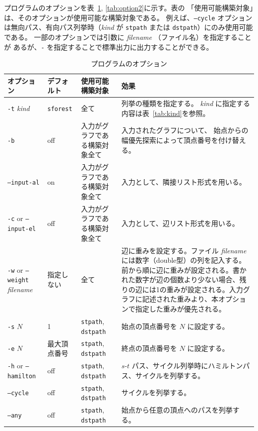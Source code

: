 \documentclass{jsarticle}
\begin{document}
プログラムのオプションを表~\ref{tab:option}, \ref{tab:option2}に示す。表の
「使用可能構築対象」は、そのオプションが使用可能な構築対象である。
例えば、\texttt{--cycle} オプションは無向パス、有向パス列挙時（\textit{kind} が
\texttt{stpath} または \texttt{dstpath}）にのみ使用可能である。
一部のオプションでは引数に \textit{filename} （ファイル名）を指定することが
あるが、\texttt{-} を指定することで標準出力に出力することができる。

\begin{table}
\caption{プログラムのオプション}
\label{tab:option}
\begin{center}
\begin{tabular}[t]{|p{120pt}|p{50pt}|p{80pt}|p{180pt}|}
\hline%
オプション & デフォルト & 使用可能構築対象 & 効果 \\ \hline \hline
\texttt{-t} \textit{kind} & \texttt{sforest} & 全て & 列挙の種類を指定する。
                            \textit{kind} に指定する内容は表~\ref{tab:kind}を参照。 \\ \hline
\texttt{-b} & off & 入力がグラフである構築対象全て & 入力されたグラフについて、
                    始点からの幅優先探索によって頂点番号を付け替える。 \\ \hline
\texttt{--input-al} & on & 入力がグラフである構築対象全て & 入力として、隣接リスト形式を用いる。 \\ \hline
\texttt{-c} or \texttt{--input-el} & off & 入力がグラフである構築対象全て & 入力として、辺リスト形式を用いる。 \\ \hline
\texttt{-w} or \texttt{--weight} \textit{filename} & 指定しない & 全て & 辺に重みを設定する。ファイル \textit{filename} には数字（double型）の列を記入する。前から順に辺に重みが設定される。書かれた数字が辺の個数より少ない場合、残りの辺には1の重みが設定される。入力グラフに記述された重みより、本オプションで指定した重みが優先される。 \\ \hline
\texttt{-s} $N$ & 1 & \texttt{stpath}, \texttt{dstpath} & 始点の頂点番号を $N$ に設定する。 \\ \hline
\texttt{-e} $N$ & 最大頂点番号 & \texttt{stpath}, \texttt{dstpath} & 終点の頂点番号を $N$ に設定する。 \\ \hline
\texttt{-h} or \texttt{--hamilton}& off & \texttt{stpath}, \texttt{dstpath} & $s$-$t$ パス、サイクル列挙時にハミルトンパス、サイクルを列挙する。 \\ \hline
\texttt{--cycle} & off & \texttt{stpath}, \texttt{dstpath} & サイクルを列挙する。 \\ \hline
\texttt{--any} & off & \texttt{stpath}, \texttt{dstpath} & 始点から任意の頂点へのパスを列挙する。 \\ \hline

\end{tabular}
\end{center}
\end{table}
\end{document}
